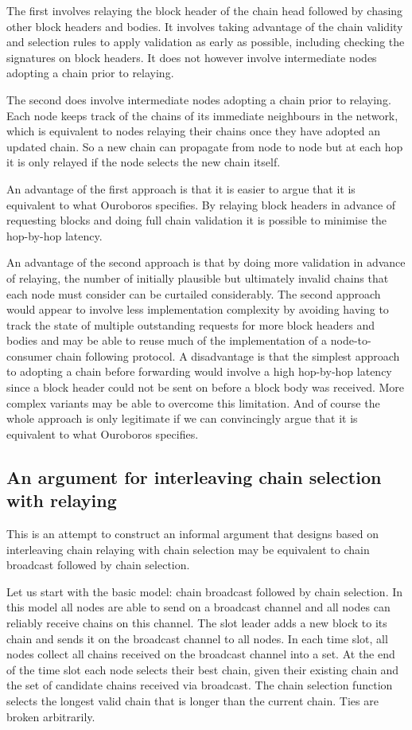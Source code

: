 \documentclass{article}
\theoremstyle{definition}{
  \newtheorem{lemma}{Lemma}[section] %
  \newtheorem{definition}[lemma]{Definition}
}
\theoremstyle{theorem}{
  \newtheorem{invariant}[lemma]{Invariant}
  \newtheorem{proofobligation}[lemma]{Proof Obligation}
}
\numberwithin{equation}{lemma}
\begin{document}
The first involves relaying the block header of the chain head followed by
chasing other block headers and bodies. It involves taking advantage of the
chain validity and selection rules to apply validation as early as possible,
including checking the signatures on block headers. It does not however involve
intermediate nodes adopting a chain prior to relaying.

The second does involve intermediate nodes adopting a chain prior to relaying.
Each node keeps track of the chains of its immediate neighbours in the network,
which is equivalent to nodes relaying their chains once they have adopted an
updated chain. So a new chain can propagate from node to node but at each
hop it is only relayed if the node selects the new chain itself.

An advantage of the first approach is that it is easier to argue that it is
equivalent to what Ouroboros specifies. By relaying block headers in advance
of requesting blocks and doing full chain validation it is possible to minimise
the hop-by-hop latency.

An advantage of the second approach is that by doing more validation in advance
of relaying, the number of initially plausible but ultimately invalid chains
that each node must consider can be curtailed considerably. The second approach
would appear to involve less implementation complexity by avoiding having to
track the state of multiple outstanding requests for more block headers and
bodies and may be able to reuse much of the implementation of a node-to-consumer
chain following protocol. A disadvantage is that the simplest approach to
adopting a chain before forwarding would involve a high hop-by-hop latency
since a block header could not be sent on before a block body was received.
More complex variants may be able to overcome this limitation. And of course
the whole approach is only legitimate if we can convincingly argue that it is
equivalent to what Ouroboros specifies.

\subsection{An argument for interleaving chain selection with relaying}

This is an attempt to construct an informal argument that designs based on
interleaving chain relaying with chain selection may be equivalent to chain
broadcast followed by chain selection.

Let us start with the basic model: chain broadcast followed by chain selection.
In this model all nodes are able to send on a broadcast channel and all nodes
can reliably receive chains on this channel. The slot leader adds a new block
to its chain and sends it on the broadcast channel to all nodes. In each time
slot, all nodes collect all chains received on the broadcast channel into a set.
At the end of the time slot each node selects their best chain, given their
existing chain and the set of candidate chains received via broadcast. The
chain selection function selects the longest valid chain that is longer than
the current chain. Ties are broken arbitrarily.
\end{document}
